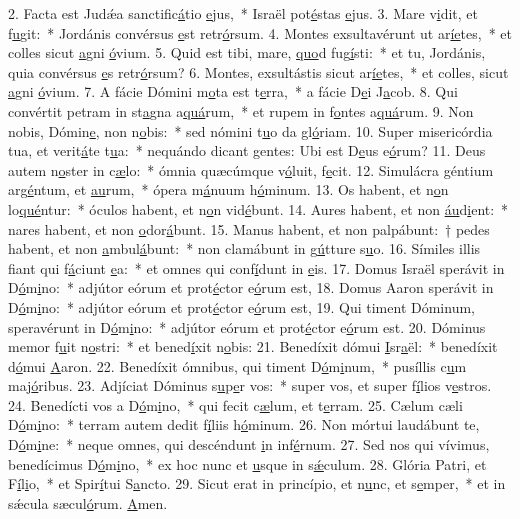 2. Facta est Judǽa sanctific\uline{á}tio \uline{e}jus,~* Israël pot\uline{é}stas \uline{e}jus.
3. Mare v\uline{i}dit, et f\uline{u}git:~* Jordánis convérsus \uline{e}st retr\uline{ó}rsum.
4. Montes exsultavérunt ut ar\uline{í}\uline{e}tes,~* et colles sicut \uline{a}gni \uline{ó}vium.
5. Quid est tibi, mare, \uline{quo}d fug\uline{í}sti:~* et tu, Jordánis, quia convérsus \uline{e}s retr\uline{ó}rsum?
6. Montes, exsultástis sicut ar\uline{í}\uline{e}tes,~* et colles, sicut \uline{a}gni \uline{ó}vium.
7. A fácie Dómini m\uline{o}ta est t\uline{e}rra,~* a fácie D\uline{e}i J\uline{a}cob.
8. Qui convértit petram in st\uline{a}gna a\uline{quá}rum,~* et rupem in f\uline{o}ntes a\uline{quá}rum.
9. Non nobis, Dómin\uline{e}, non n\uline{o}bis:~* sed nómini t\uline{u}o da gl\uline{ó}riam.
10. Super misericórdia tua, et verit\uline{á}te t\uline{u}a:~* nequándo dicant gentes: Ubi est D\uline{e}us e\uline{ó}rum?
11. Deus autem n\uline{o}ster in c\uline{æ}lo:~* ómnia quæcúmque v\uline{ó}luit, f\uline{e}cit.
12. Simulácra géntium arg\uline{é}ntum, et \uline{au}rum,~* ópera m\uline{á}nuum h\uline{ó}minum.
13. Os habent, et n\uline{o}n lo\uline{qué}ntur:~* óculos habent, et n\uline{o}n vid\uline{é}bunt.
14. Aures habent, et non \uline{áu}d\uline{i}ent:~* nares habent, et non \uline{o}dor\uline{á}bunt.
15. Manus habent, et non palpábunt:~† pedes habent, et non \uline{a}mbul\uline{á}bunt:~* non clamábunt in g\uline{ú}tture s\uline{u}o.
16. Símiles illis fiant qui f\uline{á}ciunt \uline{e}a:~* et omnes qui conf\uline{í}dunt in \uline{e}is.
17. Domus Israël sperávit in D\uline{ó}m\uline{i}no:~* adjútor eórum et prot\uline{é}ctor e\uline{ó}rum est,
18. Domus Aaron sperávit in D\uline{ó}m\uline{i}no:~* adjútor eórum et prot\uline{é}ctor e\uline{ó}rum est,
19. Qui timent Dóminum, speravérunt in D\uline{ó}m\uline{i}no:~* adjútor eórum et prot\uline{é}ctor e\uline{ó}rum est.
20. Dóminus memor f\uline{u}it n\uline{o}stri:~* et bened\uline{í}xit n\uline{o}bis:
21. Benedíxit dómui \uline{I}sr\uline{a}ël:~* benedíxit d\uline{ó}mui \uline{A}aron.
22. Benedíxit ómnibus, qui timent D\uline{ó}m\uline{i}num,~* pusíllis c\uline{u}m maj\uline{ó}ribus.
23. Adjíciat Dóminus s\uline{u}p\uline{e}r vos:~* super vos, et super f\uline{í}lios v\uline{e}stros.
24. Benedícti vos a D\uline{ó}m\uline{i}no,~* qui fecit c\uline{æ}lum, et t\uline{e}rram.
25. Cælum cæli D\uline{ó}m\uline{i}no:~* terram autem dedit f\uline{í}liis h\uline{ó}minum.
26. Non mórtui laudábunt te, D\uline{ó}m\uline{i}ne:~* neque omnes, qui descéndunt \uline{i}n inf\uline{é}rnum.
27. Sed nos qui vívimus, benedícimus D\uline{ó}m\uline{i}no,~* ex hoc nunc et \uline{u}sque in s\uline{ǽ}culum.
28. Glória Patri, et F\uline{í}l\uline{i}o,~* et Spir\uline{í}tui S\uline{a}ncto.
29. Sicut erat in princípio, et n\uline{u}nc, et s\uline{e}mper,~* et in sǽcula sæcul\uline{ó}rum. \uline{A}men.
